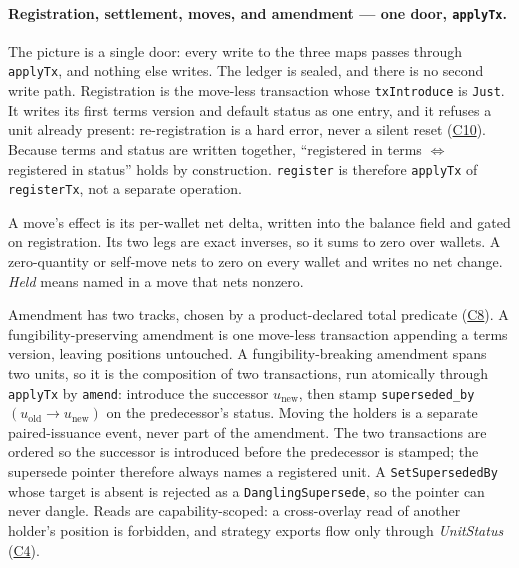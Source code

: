 \paragraph{Registration, settlement, moves, and amendment --- one door, \texttt{applyTx}.}
The picture is a single door: every write to the three maps passes through
\texttt{applyTx}, and nothing else writes. The ledger is sealed, and there is no second
write path. Registration is the move-less transaction whose \texttt{txIntroduce} is
\texttt{Just}. It writes its first terms version and default status as one entry, and it
refuses a unit already present: re-registration is a hard error, never a silent reset
(\hyperref[cond:C10]{C10}). Because terms and status are written together, ``registered
in terms $\iff$ registered in status'' holds by construction. \texttt{register} is
therefore \texttt{applyTx} of \texttt{registerTx}, not a separate operation.

A move's effect is its per-wallet net delta, written into the balance field and gated on
registration. Its two legs are exact inverses, so it sums to zero over wallets. A
zero-quantity or self-move nets to zero on every wallet and writes no net change.
\emph{Held} means named in a move that nets nonzero.

Amendment has two tracks, chosen by a product-declared total predicate
(\hyperref[cond:C8]{C8}). A fungibility-preserving amendment is one move-less transaction
appending a terms version, leaving positions untouched. A fungibility-breaking amendment
spans two units, so it is the composition of two transactions, run atomically through
\texttt{applyTx} by \texttt{amend}: introduce the successor $u_{\mathrm{new}}$, then
stamp \texttt{superseded\_by}$(u_{\mathrm{old}}\!\to u_{\mathrm{new}})$ on the
predecessor's status. Moving the holders is a separate paired-issuance event, never part
of the amendment. The two transactions are ordered so the successor is introduced before
the predecessor is stamped; the supersede pointer therefore always names a registered
unit. A \texttt{SetSupersededBy} whose target is absent is rejected as a
\texttt{DanglingSupersede}, so the pointer can never dangle. Reads are capability-scoped:
a cross-overlay read of another holder's position is forbidden, and strategy exports flow
only through \emph{UnitStatus} (\hyperref[cond:C4]{C4}).

